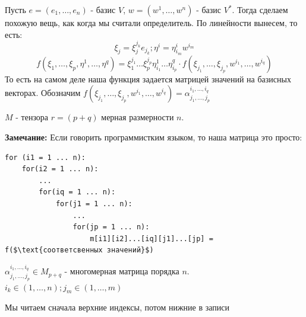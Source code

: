 Пусть $e = (e_1,\ldots, e_n)$ - базис $V$, $w = (w^1,\ldots, w^n)$ - базис $V^*$. Тогда сделаем похожую вещь, как когда мы считали определитель. По линейности вынесем, то есть:
$$\xi_j = \xi_j^{j_k}e_{j_k};\eta^i = \eta_{i_m}^iw^{i_m}$$
$$f(\xi_1,\ldots,\xi_p,\eta^1,\ldots, \eta^q) = \xi_1^{j_1}\ldots\xi_p^{j_p}\eta_{i_1}^1 \ldots \eta^q_{i_p} \cdot f(\xi_{j_1},\ldots, \xi_{j_p},w^{i_1},\ldots, w^{i_q})$$
То есть  на самом деле наша функция задается матрицей значений на базисных векторах. Обозначим $f(\xi_{j_1},\ldots, \xi_{j_p},w^{i_1},\ldots, w^{i_q}) = \alpha_{j_1,\ldots,j_p}^{i_1,\ldots,i_q}$

 $M$ -  тензора $r = (p+q)$ мерная  размерности $n$. 

\textbf{Замечание:} Если говорить программистким языком, то наша матрица это просто:

\begin{lstlisting}[mathescape]
for (i1 = 1 ... n):
    for(i2 = 1 ... n):
        ...
        for(iq = 1 ... n):
            for(j1 = 1 ... n):
                ...
                for(jp = 1 ... n):
                    m[i1][i2]...[iq][j1]...[jp] = f($\text{соответсвенных значений}$)
\end{lstlisting}


$\alpha^{i_1,\ldots,i_q}_{j_1,\ldots, j_p} \in M_{p+q}$ - многомерная матрица порядка $n$. $i_k \in (1,\ldots,n); j_m \in (1,\ldots, m)$

Мы читаем сначала верхние индексы, потом нижние в записи

